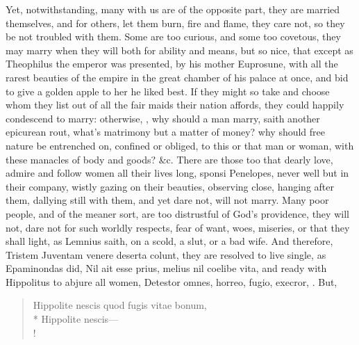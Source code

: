 Yet, notwithstanding, many with us are of the opposite part, they are
married themselves, and for others, let them burn, fire and flame, they
care not, so they be not troubled with them. Some are too curious, and
some too covetous, they may marry when they will both for ability and
means, but so nice, that except as Theophilus the emperor was
presented, by his mother Euprosune, with all the rarest beauties of the
empire in the great chamber of his palace at once, and bid to give a
golden apple to her he liked best. If they might so take and choose
whom they list out of all the fair maids their nation affords, they
could happily condescend to marry: otherwise, \etc{}, why should a man
marry, saith another epicurean rout, what's matrimony but a matter of
money? why should free nature be entrenched on, confined or obliged, to
this or that man or woman, with these manacles of body and goods? \&c.
There are those too that dearly love, admire and follow women all their
lives long, sponsi Penelopes, never well but in their company, wistly
gazing on their beauties, observing close, hanging after them, dallying
still with them, and yet dare not, will not marry. Many poor people,
and of the meaner sort, are too distrustful of God's providence, they
will not, dare not for such worldly respects, fear of want, woes,
miseries, or that they shall light, as Lemnius saith, on a scold,
a slut, or a bad wife. And therefore, Tristem Juventam venere
deserta colunt, they are resolved to live single, as Epaminondas
did, Nil ait esse prius, melius nil coelibe vita, and ready with
Hippolitus to abjure all women, Detestor omnes, horreo, fugio,
execror, \etc{}. But,

\begin{latin}%
\begin{verse}%
Hippolite nescis quod fugis vitae bonum,\\*
Hippolite nescis---\\!
\end{verse}%
\end{latin}%

